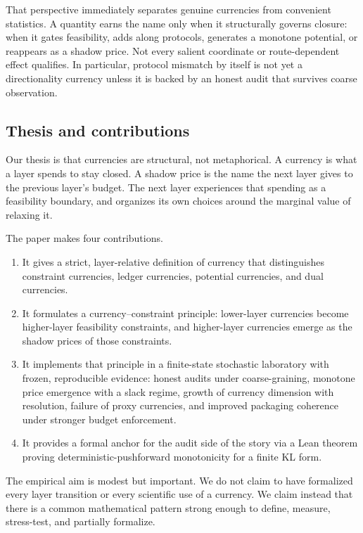 \documentclass[11pt,a4paper]{article}
\begin{document}
That perspective immediately separates genuine currencies from convenient statistics. A quantity earns the name only when it structurally governs closure: when it gates feasibility, adds along protocols, generates a monotone potential, or reappears as a shadow price. Not every salient coordinate or route-dependent effect qualifies. In particular, protocol mismatch by itself is not yet a directionality currency unless it is backed by an honest audit that survives coarse observation.

\subsection{Thesis and contributions}

Our thesis is that currencies are structural, not metaphorical. A currency is what a layer spends to stay closed. A shadow price is the name the next layer gives to the previous layer's budget. The next layer experiences that spending as a feasibility boundary, and organizes its own choices around the marginal value of relaxing it.

The paper makes four contributions.
\begin{enumerate}[leftmargin=*]
    \item It gives a strict, layer-relative definition of currency that distinguishes constraint currencies, ledger currencies, potential currencies, and dual currencies.
    \item It formulates a currency--constraint principle: lower-layer currencies become higher-layer feasibility constraints, and higher-layer currencies emerge as the shadow prices of those constraints.
    \item It implements that principle in a finite-state stochastic laboratory with frozen, reproducible evidence: honest audits under coarse-graining, monotone price emergence with a slack regime, growth of currency dimension with resolution, failure of proxy currencies, and improved packaging coherence under stronger budget enforcement.
    \item It provides a formal anchor for the audit side of the story via a Lean theorem proving deterministic-pushforward monotonicity for a finite KL form.
\end{enumerate}

The empirical aim is modest but important. We do not claim to have formalized every layer transition or every scientific use of a currency. We claim instead that there is a common mathematical pattern strong enough to define, measure, stress-test, and partially formalize.
\end{document}
